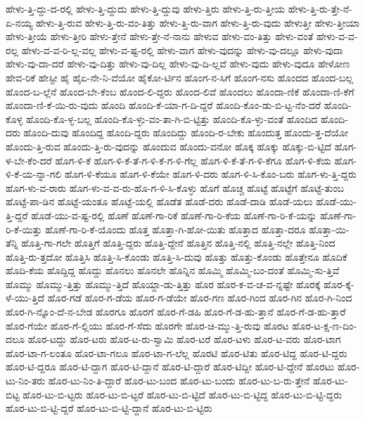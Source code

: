 {ಹೇಳು-ತ್ತಿ-ದ್ದು-ದ-ರಲ್ಲಿ
ಹೇಳು-ತ್ತಿ-ದ್ದುದು
ಹೇಳು-ತ್ತಿ-ದ್ದುವು
ಹೇಳು-ತ್ತಿರು
ಹೇಳು-ತ್ತಿ-ರು-ತ್ತೀಯ
ಹೇಳು-ತ್ತಿ-ರು-ತ್ತೇ-ನೆ-ಏ-ನಯ್ಯ
ಹೇಳು-ತ್ತಿ-ರುವ
ಹೇಳು-ತ್ತಿ-ರು-ವಂ-ತಿತ್ತು
ಹೇಳು-ತ್ತಿ-ರು-ವಾಗ
ಹೇಳು-ತ್ತಿ-ರು-ವುದು
ಹೇಳುತ್ತೀ
ಹೇಳು-ತ್ತೀಯಾ
ಹೇಳು-ತ್ತೀಯೆ
ಹೇಳು-ತ್ತೀರಿ
ಹೇಳು-ತ್ತೇನೆ
ಹೇಳು-ತ್ತೇ-ನೆ-ನಾನು
ಹೇಳುವ
ಹೇಳು-ವಂ-ತಿತ್ತು
ಹೇಳು-ವಂತೆ
ಹೇಳು-ವ-ವ-ರಲ್ಲ
ಹೇಳು-ವ-ವ-ರಿ-ಲ್ಲ-ವಲ್ಲ
ಹೇಳು-ವ-ಷ್ಟ-ರಲ್ಲಿ
ಹೇಳು-ವಾಗ
ಹೇಳು-ವುದನ್ನು
ಹೇಳು-ವು-ದಲ್ಲೂ
ಹೇಳು-ವುದಾ
ಹೇಳು-ವು-ದಾ-ದರೆ
ಹೇಳು-ವು-ದಿತ್ತು
ಹೇಳು-ವು-ದಿಲ್ಲ
ಹೇಳು-ವು-ದಿ-ಲ್ಲವೆ
ಹೇಳು-ವುದು
ಹೇಳು-ವುದೂ
ಹೇಳೋಣ
ಹೇವ-ರಿಕೆ
ಹೇಸ್ಟೀ
ಹೈ
ಹೈಏ-ನೇ-ನಿ-ವೆಯೋ
ಹೈಕೋ-ರ್ಟಿನ
ಹೊಂಗ-ನ-ಸಿಗೆ
ಹೊಂಗ-ನಸು
ಹೊಂದದ
ಹೊಂದ-ಬಲ್ಲ
ಹೊಂದ-ಬ-ಲ್ಲೆನೆ
ಹೊಂದ-ಬೇ-ಕೆಂಬ
ಹೊಂದ-ಲಿ-ದ್ದರು
ಹೊಂದ-ಲಿವೆ
ಹೊಂದಲು
ಹೊಂದಾ-ಣಿಕೆ
ಹೊಂದಾ-ಣಿ-ಕೆಗೆ
ಹೊಂದಾ-ಣಿ-ಕೆ-ಯಿ-ರು-ವುದು
ಹೊಂದಿ
ಹೊಂದಿ-ಕೆ-ಯಾ-ಗ-ದಿ-ದ್ದರೆ
ಹೊಂದಿ-ಕೊಂ-ಡು-ಬಿ-ಟ್ಟ-ನೆಂ-ದರೆ
ಹೊಂದಿ-ಕೊಳ್ಳ
ಹೊಂದಿ-ಕೊ-ಳ್ಳ-ಬಲ್ಲ
ಹೊಂದಿ-ಕೊ-ಳ್ಳು-ವಂ-ತಾ-ಗಿ-ಬಿ-ಟ್ಟಿತ್ತು
ಹೊಂದಿ-ಕೊ-ಳ್ಳು-ವಂತೆ
ಹೊಂದಿದ
ಹೊಂದಿ-ದರು
ಹೊಂದಿ-ದುವು
ಹೊಂದಿದ್ದ
ಹೊಂದಿ-ದ್ದರು
ಹೊಂದಿದ್ದು
ಹೊಂದಿ-ರ-ಬೇಕು
ಹೊಂದುತ್ತ
ಹೊಂದು-ತ್ತ-ದೆಯೋ
ಹೊಂದು-ತ್ತಿ-ರುವ
ಹೊಂದು-ತ್ತಿ-ರು-ವುದನ್ನು
ಹೊಂದುವ
ಹೊಂದು-ವನೋ
ಹೊಕ್ಕ
ಹೊಕ್ಕು
ಹೊಕ್ಕು-ಬಿ-ಟ್ಟಿದೆ
ಹೊಗ-ಳ-ಬೇ-ಕೆಂ-ದರೆ
ಹೊಗ-ಳಿ-ಕೆ
ಹೊಗ-ಳಿ-ಕೆ-ತೆ-ಗ-ಳಿ-ಕೆ-ಗ-ಳಿ-ಗೆಲ್ಲ
ಹೊಗ-ಳಿ-ಕೆ-ತೆ-ಗ-ಳಿ-ಕೆಗೂ
ಹೊಗ-ಳಿ-ಕೆಯ
ಹೊಗ-ಳಿ-ಕೆ-ಯ-ನ್ನಾ-ಗಲಿ
ಹೊಗ-ಳಿ-ಕೆಯೂ
ಹೊಗ-ಳಿ-ಕೆಯೇ
ಹೊಗ-ಳಿ-ದರು
ಹೊಗ-ಳಿ-ಸಿ-ಕೊಂ-ಬರು
ಹೊಗ-ಳು-ತ್ತಿ-ದ್ದರು
ಹೊಗ-ಳು-ವ-ರಾರು
ಹೊಗ-ಳು-ವ-ವ-ರು-ಹೊ-ಗ-ಳಿ-ಸಿ-ಕೊಳ್ಳು
ಹೊಗೆ
ಹೊಚ್ಚ
ಹೊಟ್ಟೆ
ಹೊಟ್ಟೆಗೆ
ಹೊಟ್ಟೆ-ತುಂಬ
ಹೊಟ್ಟೆ-ಪಾ-ಡಿನ
ಹೊಟ್ಟೆ-ಯಂತೂ
ಹೊಟ್ಟೆ-ಯಲ್ಲಿ
ಹೊಡೆತ
ಹೊಡೆ-ದರು
ಹೊಡೆ-ದಾಡಿ
ಹೊಡೆ-ಯಲು
ಹೊಡೆ-ಯು-ತ್ತಿ-ದ್ದರೆ
ಹೊಡೆ-ಯು-ವ-ಷ್ಟ-ರಲ್ಲಿ
ಹೊಣೆ
ಹೊಣೆ-ಗಾ-ರಿಕೆ
ಹೊಣೆ-ಗಾ-ರಿ-ಕೆಯ
ಹೊಣೆ-ಗಾ-ರಿ-ಕೆ-ಯನ್ನು
ಹೊಣೆ-ಗಾ-ರಿ-ಕೆ-ಯಿತ್ತು
ಹೊಣೆ-ಗಾ-ರಿ-ಕೆ-ಯೊಂದು
ಹೊತ್ತ
ಹೊತ್ತಾ-ಗಿ-ಹೋ-ಯಿತು
ಹೊತ್ತಾದ
ಹೊತ್ತಾ-ದರೂ
ಹೊತ್ತಾ-ಯಿ-ತೆನ್ನಿ
ಹೊತ್ತಿ-ಗಾ-ಗಲೇ
ಹೊತ್ತಿಗೆ
ಹೊತ್ತಿ-ದ್ದರು
ಹೊತ್ತಿ-ದ್ದೇನೆ
ಹೊತ್ತಿನ
ಹೊತ್ತಿ-ನಲ್ಲಿ
ಹೊತ್ತಿ-ನಲ್ಲೇ
ಹೊತ್ತಿ-ನಿಂದ
ಹೊತ್ತಿ-ರು-ತ್ತದೋ
ಹೊತ್ತಿಸಿ
ಹೊತ್ತಿ-ಸಿ-ಕೊಂಡು
ಹೊತ್ತಿ-ಸಿ-ದುವು
ಹೊತ್ತು
ಹೊತ್ತು-ಕೊಂಡು
ಹೊತ್ತೇನೂ
ಹೊದಿಕೆ
ಹೊದಿ-ಕೆಯ
ಹೊದ್ದಿದ್ದ
ಹೊದ್ದು
ಹೊನಲು
ಹೊನಲೇ
ಹೊನ್ನಿನ
ಹೊಮ್ಮಿ
ಹೊಮ್ಮಿ-ಬಂ-ದಂತೆ
ಹೊಮ್ಮಿ-ಸು-ತ್ತಿವೆ
ಹೊಮ್ಮು
ಹೊಮ್ಮು-ತ್ತಿತ್ತು
ಹೊಮ್ಮು-ತ್ತಿದೆ
ಹೊಯ್ದಾ-ಡು-ತ್ತಿತ್ತು
ಹೊರ
ಹೊರ-ಕ-ವ-ಚ-ವ-ನ್ನಷ್ಟೇ
ಹೊರಕ್ಕೆ
ಹೊರ-ಕ್ಕೆ-ಳೆ-ಯು-ತ್ತಿದೆ
ಹೊರ-ಗಡೆ
ಹೊರ-ಗ-ಡೆಯ
ಹೊರ-ಗ-ಡೆಯೇ
ಹೊರ-ಗಣ
ಹೊರ-ಗಿಂದ
ಹೊರ-ಗಿನ
ಹೊರ-ಗಿ-ನಿಂದ
ಹೊರ-ಗಿ-ನ್ನೊಂ-ದೆ-ನ-ಬೇಡ
ಹೊರಗೂ
ಹೊರಗೆ
ಹೊರ-ಗೆ-ಡಹಿ
ಹೊರ-ಗೆ-ಡ-ಹು-ತ್ತಾನೆ
ಹೊರ-ಗೆ-ಡ-ಹು-ತ್ತಾರೆ
ಹೊರ-ಗೆಯೇ
ಹೊರ-ಗೆ-ಲ್ಲಿಯು
ಹೊರ-ಗೆ-ಸೆದು
ಹೊರಗೇ
ಹೊರ-ಚಿ-ಮ್ಮು-ತ್ತಿ-ರುವು
ಹೊರಟ
ಹೊರ-ಟ-ಕ್ಷ-ಣ-ದಿಂ-ದಲೂ
ಹೊರ-ಟದ್ದು
ಹೊರ-ಟರು
ಹೊರ-ಟ-ರು-ಸ್ವಾಮಿ
ಹೊರ-ಟರೆ
ಹೊರ-ಟಳು
ಹೊರ-ಟ-ವರು
ಹೊರ-ಟಾಗ
ಹೊರ-ಟಾ-ಗ-ಲಂತೂ
ಹೊರ-ಟಾ-ಗಲೂ
ಹೊರ-ಟಾ-ಗ-ಲೆಲ್ಲ
ಹೊರಟಿ
ಹೊರ-ಟಿತು
ಹೊರ-ಟಿದ್ದ
ಹೊರ-ಟಿ-ದ್ದರು
ಹೊರ-ಟಿ-ದ್ದರೂ
ಹೊರ-ಟಿ-ದ್ದಾಗ
ಹೊರ-ಟಿ-ದ್ದಾನೆ
ಹೊರ-ಟಿ-ದ್ದಾರೆ
ಹೊರ-ಟಿದ್ದೀ
ಹೊರ-ಟಿ-ದ್ದೇನೆ
ಹೊರಟು
ಹೊರ-ಟು-ನಿಂ-ತರು
ಹೊರ-ಟು-ನಿಂ-ತಿ-ದ್ದಾರೆ
ಹೊರ-ಟು-ಬಂದ
ಹೊರ-ಟು-ಬಂದು
ಹೊರ-ಟು-ಬ-ರು-ತ್ತೇನೆ
ಹೊರ-ಟು-ಬಿಟ್ಟ
ಹೊರ-ಟು-ಬಿ-ಟ್ಟರು
ಹೊರ-ಟು-ಬಿ-ಟ್ಟರೆ
ಹೊರ-ಟು-ಬಿ-ಟ್ಟಿದೆ
ಹೊರ-ಟು-ಬಿ-ಟ್ಟಿದ್ದ
ಹೊರ-ಟು-ಬಿ-ಟ್ಟಿ-ದ್ದರು
ಹೊರ-ಟು-ಬಿ-ಟ್ಟಿ-ದ್ದರೆ
ಹೊರ-ಟು-ಬಿ-ಟ್ಟಿ-ದ್ದಾನೆ
ಹೊರ-ಟು-ಬಿ-ಟ್ಟಿರು
}

